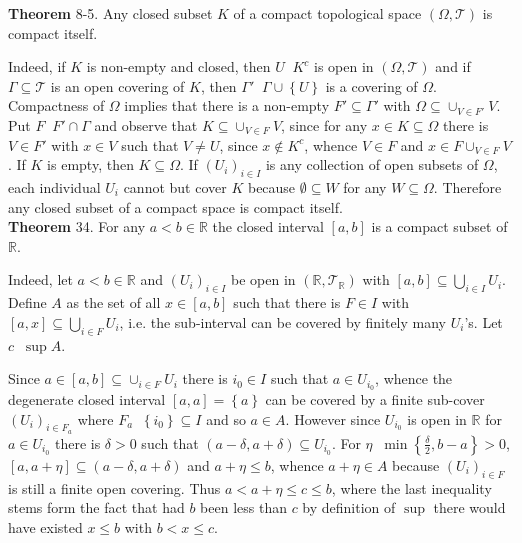 \documentclass[a4paper]{article}
\newcommand{\obj}[1]{\left\{ #1 \right \}}
\newcommand{\clo}[1]{\left [ #1 \right ]}
\newcommand{\brac}[1]{\left ( #1 \right )}
\newcommand{\Real}{\mathbb{R}}
\newcommand{\Tcal}{\mathcal{T}}
\newcommand{\defn}{\mathop{\overset{\Delta}{=}}\nolimits}
\begin{document}
\label{thm:clo_subset_compact} \noindent \textbf{Theorem} 8-5.
Any closed subset $K$ of a compact topological space $\brac{\Omega, \Tcal}$ is compact itself.

Indeed, if $K$ is non-empty and closed, then $U\defn K^c$ is open in $\brac{\Omega, \Tcal}$ and if $\Gamma\subseteq\Tcal$ is an open covering of $K$, then $\Gamma'\defn \Gamma\cup\obj{U}$ is a covering of $\Omega$. Compactness of $\Omega$ implies that there is a non-empty $F'\subseteq \Gamma'$ with $\Omega \subseteq \cup_{V\in F'} V$. Put $F\defn F'\cap \Gamma$ and observe that $K\subseteq \cup_{V\in F} V$, since for any $x\in K\subseteq \Omega$ there is $V\in F'$ with $x\in V$ such that $V\neq U$, since $x\notin K^c$, whence $V\in F$ and $x\in F\cup_{V\in F} V$. If $K$ is empty, then $K\subseteq \Omega$. If $\brac{U_i}_{i\in I}$ is any collection of open subsets of $\Omega$, each individual $U_i$ cannot but cover $K$ because $\emptyset\subseteq W$ for any $W\subseteq \Omega$. Therefore any closed subset of a compact space is compact itself.\\


\label{thm:hiene_borel} \noindent \textbf{Theorem} 34.
For any $a<b\in \Real$ the closed interval $\clo{a,b}$ is a compact subset of $\Real$.

Indeed, let $a<b\in \Real$ and $\brac{U_i}_{i\in I}$ be open in $\brac{\Real, \Tcal_\Real}$ with $\clo{a,b}\subseteq \bigcup_{i\in I} U_i$. Define $A$ as the set of all $x\in \clo{a,b}$ such that there is $F\in I$ with $\clo{a, x}\subseteq\bigcup_{i\in F} U_i$, i.e. the sub-interval can be covered by finitely many $U_i$'s. Let $c\defn \sup A$.

Since $a\in \clo{a,b}\subseteq \cup_{i\in F} U_i$ there is $i_0\in I$ such that $a\in U_{i_0}$, whence the degenerate closed interval $\clo{a, a} = \obj{a}$ can be covered by a finite sub-cover $\brac{U_i}_{i\in F_a}$ where $F_a\defn \obj{i_0}\subseteq I$ and so $a\in A$. However since $U_{i_0}$ is open in $\Real$ for $a\in U_{i_0}$ there is $\delta > 0$ such that $\brac{a-\delta, a+\delta} \subseteq U_{i_0}$. For $\eta\defn \min\obj{\frac{\delta}{2}, b-a} > 0$, $\clo{a, a+\eta}\subseteq\brac{a-\delta, a+\delta}$ and $a+\eta \leq b$, whence $a+\eta \in A$ because $\brac{U_i}_{i\in F}$ is still a finite open covering. Thus $a < a+\eta \leq c\leq b$, where the last inequality stems form the fact that had $b$ been less than $c$ by definition of $\sup$ there would have existed $x\leq b$ with $b < x \leq c$.
\end{document}

